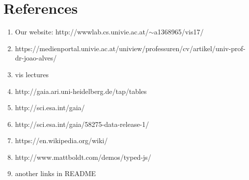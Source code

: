 \documentclass{article}
\begin{document}
\section {References}
\begin{enumerate}
\item Our website: http://wwwlab.cs.univie.ac.at/$\sim$a1368965/vis17/
\item https://medienportal.univie.ac.at/uniview/professuren/cv/artikel/univ-prof-dr-joao-alves/
\item vis lectures
\item http://gaia.ari.uni-heidelberg.de/tap/tables
\item http://sci.esa.int/gaia/
\item http://sci.esa.int/gaia/58275-data-release-1/
\item https://en.wikipedia.org/wiki/
\item http://www.mattboldt.com/demos/typed-js/
\item another links in README
\end{enumerate}
\end{document}
